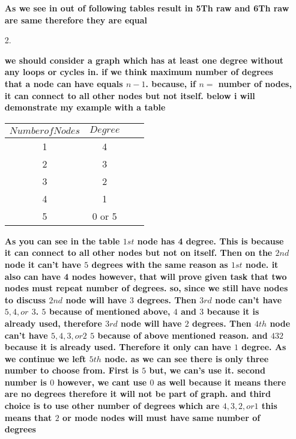 \documentclass[11pt]{article}
\theoremstyle{thmstyle}
\begin{document}
\begin{itemize}
\begin{center}
\begin{tabular} {|c|c|c|c|c|c|c|c|c|}
\end{tabular}
\end{center}




{\textbf{As we see in out of following tables result in 5Th raw and 6Th raw are same therefore they are equal  }}



\hspace{1cm}


\item[2.]  


{\textbf{we should consider a graph which has at least one degree without any loops or cycles in. if we think maximum number of degrees that a node can have  equals $n-1$. because, if $n =$ number of nodes, it can connect to all other nodes but not itself. below i will demonstrate my example with a table }}



\begin{center}
\begin{tabular} {|c|c|c|c|}

\hline
$Number of Nodes $& $Degree $  \\
\hline
1 & 4   \\
\hline
2 & 3   \\
\hline
3 & 2  \\
\hline
4 & 1   \\
\hline
5 & 0 or 5   \\
\hline

\end{tabular}
\end{center}

{\textbf{As you can see in the table $1st$ node has 4 degree. This is because it can connect to all other nodes but not on itself. Then on the $2nd$ node it can't have $5$ degrees with the same reason as $1st$ node. it also can have 4 nodes however, that will prove given task that two nodes must repeat number of degrees. so, since we still have nodes to discuss $2nd$ node will have $3$ degrees. Then $3rd$ node can't have $5, 4, or$ $ 3$. $5$ because of mentioned above, $4$ and $3$ because it is already used, therefore $3rd$ node will have $2$ degrees. Then $4th$ node can't have $5, 4, 3, or 2$ $5$ because of above mentioned reason. and $4 3 2 $ because it is already used. Therefore it only can have $1$ degree. As we continue we left $5th$ node. as we can see there is only three number to choose from. First is $5$ but, we can's use it. second number is $0 $ however, we cant use $0$ as well because it means there are no degrees therefore it will not be part of graph. and third choice is to use other number of degrees which are $4, 3, 2, or 1 $ this means that $2 $ or mode nodes will must have same number of degrees  }}



\end{itemize}
\end{document}
